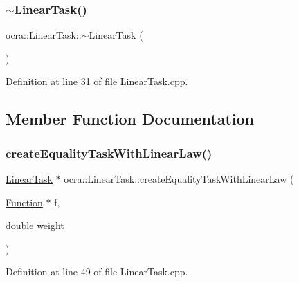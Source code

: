 \hypertarget{classocra_1_1LinearTask_ad443b3044cc66e3e68ea3f5062e37453}{}\label{classocra_1_1LinearTask_ad443b3044cc66e3e68ea3f5062e37453} 
\subsubsection{\texorpdfstring{$\sim$\+Linear\+Task()}{~LinearTask()}}
{\footnotesize\ttfamily ocra\+::\+Linear\+Task\+::$\sim$\+Linear\+Task (\begin{DoxyParamCaption}{ }\end{DoxyParamCaption})}



Definition at line 31 of file Linear\+Task.\+cpp.



\subsection{Member Function Documentation}
\hypertarget{classocra_1_1LinearTask_a566facd954e4cdedb6d28cf6acd81a0f}{}\label{classocra_1_1LinearTask_a566facd954e4cdedb6d28cf6acd81a0f} 
\subsubsection{\texorpdfstring{create\+Equality\+Task\+With\+Linear\+Law()}{createEqualityTaskWithLinearLaw()}\hspace{0.1cm}{\footnotesize\ttfamily [1/2]}}
{\footnotesize\ttfamily \hyperlink{classocra_1_1LinearTask}{Linear\+Task} $\ast$ ocra\+::\+Linear\+Task\+::create\+Equality\+Task\+With\+Linear\+Law (\begin{DoxyParamCaption}\item[{\hyperlink{classocra_1_1Function}{Function} $\ast$}]{f,  }\item[{double}]{weight }\end{DoxyParamCaption})\hspace{0.3cm}{\ttfamily [static]}}



Definition at line 49 of file Linear\+Task.\+cpp.

